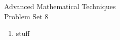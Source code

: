 \documentclass{article}
\begin{document}
\thispagestyle{fancy}
\begin{center}\LARGE{Advanced Mathematical Techniques \\ Problem Set 8}\end{center}
\vspace{10mm}
\begin{enumerate}
    \item stuff
\end{enumerate}
\end{document}
